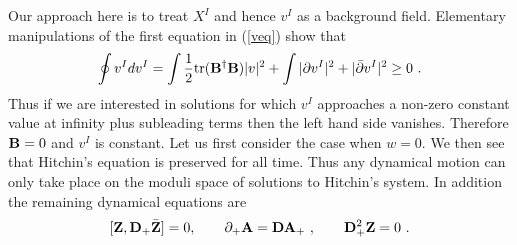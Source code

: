\documentclass[12pt]{article}
\numberwithin{equation}{section}
\begin{document}
Our approach here is to treat $X^I$ and hence $v^I$ as a background field.  Elementary manipulations of the first equation in (\ref{veq}) show that
\begin{equation}
\oint v^Id v^I = \int  \frac{1}{2} {\rm tr }({\bf B}^\dag{\bf B})|v|^2 + \int  |\partial v^I|^2 + |\bar\partial v^I|^2\ge 0\ .
\end{equation}
Thus if we are interested in solutions for which $v^I$ approaches a non-zero constant value at infinity plus subleading terms then the left hand side vanishes. Therefore ${\bf B}=0$ and $v^I$ is constant.  Let us first consider the case when $w=0$. We then see that  Hitchin's equation is preserved for all time. Thus any dynamical motion can only take place on the moduli space of solutions to Hitchin's system. In addition the remaining dynamical equations are 
\begin{align}
\label{dynamics}
[{\bf Z},{\bf D}_+\bar {\bf Z}]=0,\qquad  \partial_+ {\bf A} = {\bf D}{\bf A}_+\ ,\qquad  {\bf D}_+^2{\bf Z}=0 \ .
\end{align}
\end{document}
